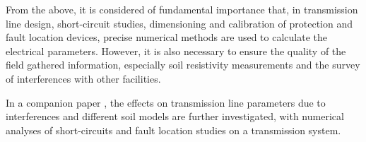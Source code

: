\documentclass[conference]{IEEEtran}
\begin{document}
From the above, it is considered of fundamental importance that, in transmission line design, short-circuit studies, dimensioning and calibration of protection and fault location devices, precise numerical methods are used to calculate the electrical parameters. However, it is also necessary to ensure the quality of the field gathered information, especially soil resistivity measurements and the survey of interferences with other facilities. 

In a companion paper \cite{Moraes2021}, the effects on transmission line parameters due to interferences and different soil models are further investigated, with numerical analyses of short-circuits and fault location studies on a transmission system.  




\nocite{*}

\end{document}
